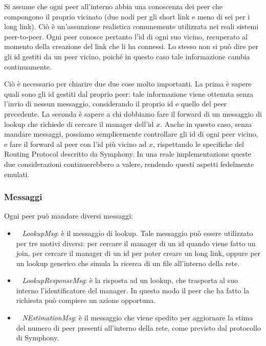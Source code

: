\documentclass[prodmode,acmtap]{acmlarge}
\begin{document}
Si assume che ogni peer all'interno abbia una conoscenza dei peer che compongono il proprio vicinato (due nodi per gli short link e meno di sei per i long link). Ciò è un'assunzione realistica comunemente utilizzata nei reali sistemi peer-to-peer. Ogni peer conosce pertanto l'id di ogni suo vicino, recuperato al momento della creazione del link che li ha connessi. Lo stesso non si può dire per gli id gestiti da un peer vicino, poiché in questo caso tale informazione cambia continuamente. 

Ciò è necessario per chiarire due due cose molto importanti. La prima è sapere quali sono gli id gestiti dal proprio peer: tale informazione viene ottenuta senza l'invio di nessun messaggio, considerando il proprio id e quello del peer precedente. La seconda è sapere a chi dobbiamo fare il forward di un messaggio di lookup che richiede di cercare il manager dell'id $x$. Anche in questo caso, senza mandare messaggi, possiamo semplicemente controllare gli id di ogni peer vicino, e fare il forward al peer con l'id più vicino ad $x$, rispettando le specifiche del Routing Protocol descritto da Symphony. In una reale implementazione queste due considerazioni continuerebbero a valere, rendendo questi aspetti fedelmente emulati.

\subsubsection{Messaggi}

Ogni peer può mandare diversi messaggi:

\begin{itemize}
	\item ~ \textit{LookupMsg}: è il messaggio di lookup. Tale messaggio può essere utilizzato per tre motivi diversi: per cercare il manager di un id quando viene fatto un join, per cercare il manager di un id per poter creare un long link, oppure per un lookup generico che simula la ricerca di un file all'interno della rete.
	\item ~ \textit{LookupResponseMsg}: è la risposta ad un lookup, che trasporta al suo interno l'identificatore del manager. In questo modo il peer che ha fatto la richiesta può compiere un azione opportuna.
	\item ~ \textit{NEstimationMsg}: è il messaggio che viene spedito per aggiornare la stima del numero di peer presenti all'interno della rete, come previsto dal protocollo di Symphony.
\end{itemize}
\end{document}
